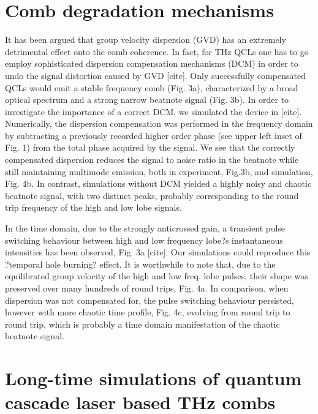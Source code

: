 \documentclass[journal]{IEEEtran}
\begin{document}
\section{Comb degradation mechanisms}
It has been argued that group velocity dispersion (GVD) has an extremely detrimental effect onto the comb coherence. In fact, for THz QCLs one has to go employ sophisticated dispersion compensation mechanisms (DCM) in order to undo the signal distortion caused by GVD [cite].  Only successfully compensated QCLs would emit a stable frequency comb (Fig. 3a), characterized by a broad optical spectrum and a strong narrow beatnote signal (Fig. 3b). In order to investigate the importance of a correct DCM, we simulated the device in [cite]. Numerically, the dispersion compensation was performed in the frequency domain by subtracting a previously recorded higher order phase (see upper left inset of Fig. 1) from the total phase acquired by the signal. We see that the correctly compensated dispersion reduces the signal to noise ratio in the beatnote while still maintaining multimode emission, both in experiment, Fig.3b, and simulation, Fig. 4b. In contrast, simulations without DCM yielded a highly noisy and chaotic beatnote signal, with two distinct peaks, probably corresponding to the round trip frequency of the high and low lobe signals. 

In the time domain, due to the strongly anticrossed gain, a transient pulse switching behaviour between high and low frequency lobe?s instantaneous intensities has been observed, Fig. 3a [cite]. Our simulations could reproduce this ?temporal hole burning? effect. It is worthwhile to note that, due to the equilibrated group velocity of the high and low freq. lobe pulses, their shape was preserved over many hundreds of round trips, Fig. 4a. In comparison, when dispersion was not compensated for, the pulse switching behaviour persisted, however with more chaotic time profile, Fig. 4c, evolving from round trip to round trip, which is probably a time domain manifestation of the chaotic beatnote signal.  

\section{Long-time simulations of quantum cascade laser based THz combs}
\end{document}
